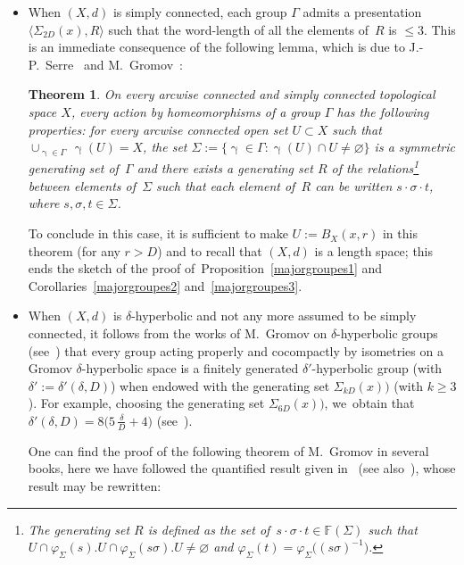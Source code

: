 \documentclass[pdftex]{sigma}
\numberwithin{equation}{section}
\newtheorem{theor}{Theorem}[section]
\newcommand{\g}{\operatorname{\gamma}}
\begin{document}
\begin{itemize}\itemsep=0pt
\item When $(X,d)$ is simply connected, each group $\Gamma$ admits a presentation $\langle \Sigma_{2 D} (x), R \rangle$
such that the word-length of all the elements of~$R$ is $\le 3$. This is an immediate consequence of the following lemma, which is due to J.-P.~Serre~\cite[p.~30]{Se} and M.~Gromov~\cite{Gr1}:

\begin{theor}%
On every arcwise connected and simply connected topological space $X$, every action by
homeomorphisms of a group $\Gamma$ has the following properties: for every arcwise connected open set $U \subset X$ such that
$ \cup_{\g \in \Gamma} \, \g (U) = X$, the set $\Sigma := \{ \g \in \Gamma \colon \g(U) \cap U \ne \varnothing\} $ is a symmetric generating set of~$\Gamma$ and
there exists a generating set
$R$ of the relations\footnote{The generating set $R$ is defined as the set of~$ s\cdot \sigma \cdot t \in \mathbb F (\Sigma)$ such that $U \cap \varphi_\Sigma (s).U \cap \varphi_\Sigma (s \sigma).U \ne \varnothing$ and $ \varphi_\Sigma (t) = \varphi_\Sigma \big( (s \sigma)^{-1}\big)$.} between elements of~$\Sigma$ such that each element of~$R$ can
be written $ s\cdot \sigma \cdot t$, where $s,\sigma, t \in \Sigma$.
\end{theor}
To conclude in this case, it is sufficient to make $U := B_X (x, r)$ in
this theorem (for any $r > D$) and to recall that $(X,d)$ is a length space; this ends the sketch of the proof of~Proposition~\ref{majorgroupes1} and Corollaries~\ref{majorgroupes2} and~\ref{majorgroupes3}.

\item When $(X,d)$ is $\delta$-hyperbolic and not any more assumed to be simply connected, it follows from the works of M.~Gromov on $\delta$-hyperbolic groups
(see~\cite[Theorems~3.22 and~5.12, p.~88]{GH}) that every group acting properly and cocompactly by isometries on a
Gromov $\delta$-hyperbolic space is a finitely generated $\delta'$-hyperbolic group (with $\delta' := \delta' (\delta, D)$) when endowed with the generating set $\Sigma_{k D} (x))$ (with $k \ge 3$). For example, choosing the gene\-ra\-ting set $ \Sigma_{6 D} (x))$, we~obtain that $\delta' (\delta, D)
= 8 \big( 5\,\frac{\delta}{D} + 4\big)$ (see~\cite{BCGS2}).

One can find the proof of the following theorem of M.~Gromov in several books, here we have followed the quantified result given in~\cite[Chapitre~5, proof of
Theorem~2.3]{CDP} (see also~\cite[Chapitre~4, Proposition~17]{GH}), whose result may be rewritten:


\end{itemize}
\end{document}

